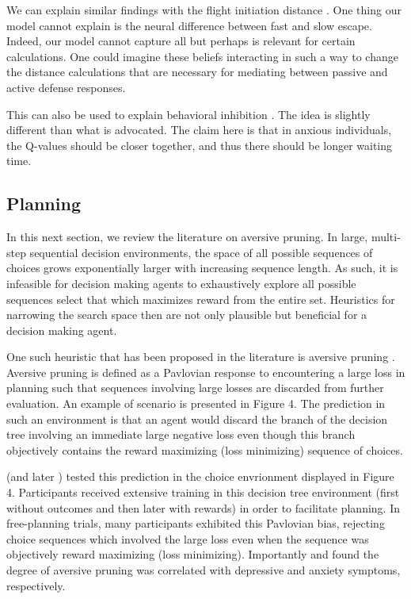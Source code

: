 \documentclass[11pt]{article} %
\begin{document}
We can explain similar findings with the flight initiation distance \citep{Mobbs2018,
Mobbs2019}. One thing our model cannot explain is the neural difference between
fast and slow escape. Indeed, our model cannot capture all but perhaps is relevant
for certain calculations. One could imagine these beliefs interacting in such a
way to change the distance calculations that are necessary for mediating between
passive and active defense responses.

This can also be used to explain behavioral inhibition \citep{bach2015, khemka2017}.
The idea is slightly different than what is advocated. The claim here is that
in anxious individuals, the Q-values should be closer together, and thus there
should be longer waiting time.

\subsection{Planning}

In this next section, we review the literature on aversive pruning. In large,
multi-step sequential decision environments, the space of all possible sequences
of choices grows exponentially larger with increasing sequence length. As such,
it is infeasible for decision making agents to exhaustively explore all possible
sequences select that which maximizes reward from the entire set. Heuristics for
narrowing the search space then are not only plausible but beneficial for a
decision making agent.

One such heuristic that has been proposed in the literature is aversive pruning
\citep{Huys2012}. Aversive pruning is defined as a Pavlovian response to encountering
a large loss in planning such that sequences involving large losses are discarded
from further evaluation. An example of scenario is presented in Figure 4. The prediction
in such an environment is that an agent would discard the branch of the decision
tree involving an immediate large negative loss even though this branch objectively
contains the reward maximizing (loss minimizing) sequence of choices.

\cite{Huys2012} (and later \cite{Lally2017}) tested this prediction in the
choice envrionment displayed in Figure 4. Participants received extensive training
in this decision tree environment (first without outcomes and then later with
rewards) in order to facilitate planning. In free-planning trials, many participants
exhibited this Pavlovian bias, rejecting choice sequences which involved the large
loss even when the sequence was objectively reward maximizing (loss minimizing).
Importantly \cite{Huys2012} and \cite{Lally2017} found the degree of aversive
pruning was correlated with depressive and anxiety symptoms, respectively.
\end{document}
